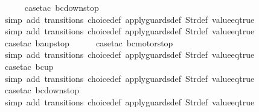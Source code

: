 \begin{isabellebody}
\ \ \ \ \isamarkupfalse%
\ {\isacharparenleft}case{\isacharunderscore}tac\ {\isachardoublequoteopen}bc{\isacharequal}down{}{}stop{\isachardoublequoteclose}{\isacharparenright}\isanewline
\ \ \ \ \ \isamarkupfalse%
\ {\isacharparenleft}simp\ add{\isacharcolon}\ transitions\ choice{\isacharunderscore}def\ apply{\isacharunderscore}guards{\isacharunderscore}def\ Str{\isacharunderscore}def\ value{\isacharunderscore}eq{\isacharunderscore}true{\isacharparenright}\isanewline
\ \ \ \ \isamarkupfalse%
\ {\isacharparenleft}simp\ add{\isacharcolon}\ transitions\ choice{\isacharunderscore}def\ apply{\isacharunderscore}guards{\isacharunderscore}def\ Str{\isacharunderscore}def\ value{\isacharunderscore}eq{\isacharunderscore}true{\isacharparenright}\isanewline
\ \ \ \isamarkupfalse%
\ {\isacharparenleft}case{\isacharunderscore}tac\ {\isachardoublequoteopen}ba{\isacharequal}up{}{}stop{\isachardoublequoteclose}{\isacharparenright}\isanewline
\ \ \ \ \isamarkupfalse%
\ {\isacharparenleft}case{\isacharunderscore}tac\ {\isachardoublequoteopen}bc{\isacharequal}motorstop{}{\isachardoublequoteclose}{\isacharparenright}\isanewline
\ \ \ \ \ \isamarkupfalse%
\ {\isacharparenleft}simp\ add{\isacharcolon}\ transitions\ choice{\isacharunderscore}def\ apply{\isacharunderscore}guards{\isacharunderscore}def\ Str{\isacharunderscore}def\ value{\isacharunderscore}eq{\isacharunderscore}true{\isacharparenright}\isanewline
\ \ \ \ \isamarkupfalse%
\ {\isacharparenleft}case{\isacharunderscore}tac\ {\isachardoublequoteopen}bc{\isacharequal}up{}{}{\isachardoublequoteclose}{\isacharparenright}\isanewline
\ \ \ \ \ \isamarkupfalse%
\ {\isacharparenleft}simp\ add{\isacharcolon}\ transitions\ choice{\isacharunderscore}def\ apply{\isacharunderscore}guards{\isacharunderscore}def\ Str{\isacharunderscore}def\ value{\isacharunderscore}eq{\isacharunderscore}true{\isacharparenright}\isanewline
\ \ \ \ \isamarkupfalse%
\ {\isacharparenleft}case{\isacharunderscore}tac\ {\isachardoublequoteopen}bc{\isacharequal}down{}{}stop{\isachardoublequoteclose}{\isacharparenright}\isanewline
\ \ \ \ \ \isamarkupfalse%
\ {\isacharparenleft}simp\ add{\isacharcolon}\ transitions\ choice{\isacharunderscore}def\ apply{\isacharunderscore}guards{\isacharunderscore}def\ Str{\isacharunderscore}def\ value{\isacharunderscore}eq{\isacharunderscore}true{\isacharparenright}\isanewline

\end{isabellebody}
